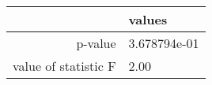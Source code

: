 \begin{tabular}{|r|l|}
  \hline
    & values \\
  \hline
  p-value & 3.678794e-01 \\
  \hline
  value of statistic F & 2.00 \\
  \hline
\end{tabular}
